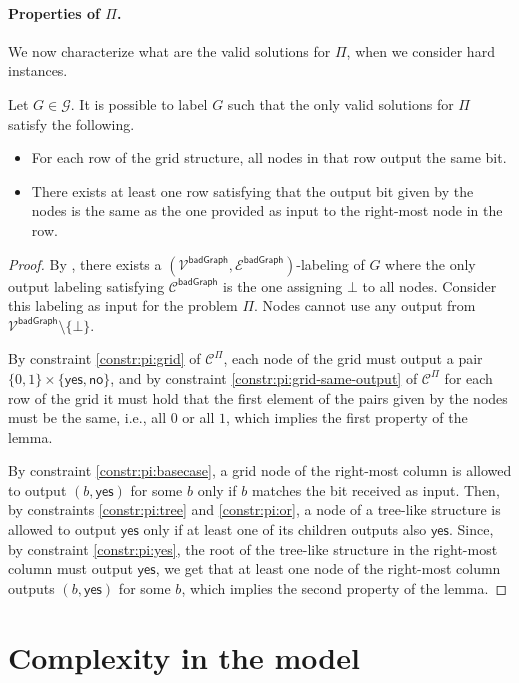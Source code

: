 \documentclass[11pt]{article}
\newcommand{\lbadgraph}{\mathsf {badGraph}}
\newcommand{\lyes}{\mathsf {yes}}
\newcommand{\lno}{\mathsf {no}}
\begin{document}
\paragraph{\boldmath Properties of $\Pi$.}
We now characterize what are the valid solutions for $\Pi$, when we consider hard instances.
\begin{lemma}\label{lem:pi-good-sol}
	Let $G \in \mathcal{G}$. It is possible to label $G$ such that the only valid solutions for $\Pi$ satisfy the following.
	\begin{itemize}
		\item For each row of the grid structure, all nodes in that row output the same bit.
		\item There exists at least one row satisfying that the output bit given by the nodes is the same as the one provided as input to the right-most node in the row.
	\end{itemize}
\end{lemma}
\begin{proof}
	By , there exists a $(\mathcal{V^\lbadgraph},\mathcal{E^\lbadgraph})$-labeling of $G$ where the only output labeling satisfying  $\mathcal{C}^{\lbadgraph}$ is the one assigning $\bot$ to all nodes. Consider this labeling as input for the problem $\Pi$. Nodes cannot use any output from $\mathcal{V^\lbadgraph}\setminus\{\bot\}$.
	
	By constraint \ref{constr:pi:grid} of $\mathcal{C}^\Pi$, each node of the grid must output a pair $\{0,1\} \times \{\lyes,\lno\}$, and by constraint \ref{constr:pi:grid-same-output} of $\mathcal{C}^\Pi$ for each row of the grid it must hold that the first element of the pairs given by the nodes must be the same, i.e., all $0$ or all $1$, which implies the first property of the lemma.
	
	By constraint \ref{constr:pi:basecase}, a grid node of the right-most column is allowed to output $(b,\lyes)$ for some $b$ only if $b$ matches the bit received as input. 
	Then, by constraints \ref{constr:pi:tree} and \ref{constr:pi:or}, a node of a tree-like structure is allowed to output $\lyes$ only if at least one of its children outputs also $\lyes$. Since, by 
	constraint \ref{constr:pi:yes}, the root of the tree-like structure in the right-most column must output $\lyes$, we get that at least one node of the right-most column outputs $(b,\lyes)$ for some $b$, which implies the second property of the lemma.
\end{proof}
	

\section{Complexity in the \local model}\label{sec:pi-complexity}
\end{document}
